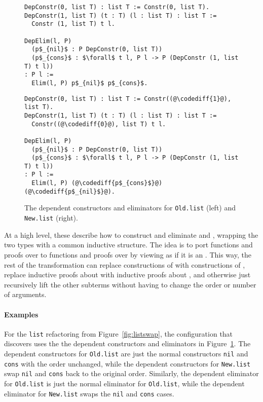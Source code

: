 \begin{figure}
\begin{minipage}{0.46\textwidth}
\begin{lstlisting}
DepConstr(0, list T) : list T := Constr(0, list T).
DepConstr(1, list T) (t : T) (l : list T) : list T :=
  Constr (1, list T) t l.

DepElim(l, P)
  (p$_{nil}$ : P DepConstr(0, list T))
  (p$_{cons}$ : $\forall$ t l, P l -> P (DepConstr (1, list T) t l))
: P l :=
  Elim(l, P) p$_{nil}$ p$_{cons}$.
\end{lstlisting}
\end{minipage}
\hfill
\begin{minipage}{0.46\textwidth}
\begin{lstlisting}
DepConstr(0, list T) : list T := Constr((@\codediff{1}@), list T).
DepConstr(1, list T) (t : T) (l : list T) : list T :=
  Constr((@\codediff{0}@), list T) t l.

DepElim(l, P)
  (p$_{nil}$ : P DepConstr(0, list T))
  (p$_{cons}$ : $\forall$ t l, P l -> P (DepConstr (1, list T) t l))
: P l :=
  Elim(l, P) (@\codediff{p$_{cons}$}@) (@\codediff{p$_{nil}$}@).
\end{lstlisting}
\end{minipage}
\caption{The dependent constructors and eliminators for \lstinline{Old.list} (left) and \lstinline{New.list} (right).}
\label{fig:listconfig}
\end{figure}

At a high level, these describe how to construct and eliminate \A and \B, wrapping the two types with a common inductive structure.
The idea is to port functions and proofs over \A to functions and proofs over \B by viewing \B as if it is an \A.
This way, the rest of the transformation can replace constructions of \A with constructions of \B,
replace inductive proofs about \A with inductive proofs about \B, and otherwise just recursively lift
the other subterms without having to change the order or number of arguments.

\paragraph{Examples}
For the \lstinline{list} refactoring from Figure~\ref{fig:listswap},
the configuration that \toolname discovers uses the the dependent constructors
and eliminators in Figure~\ref{fig:listconfig}. The dependent constructors for \lstinline{Old.list}
are just the normal constructors \lstinline{nil} and \lstinline{cons} with the order unchanged,
while the dependent constructors for \lstinline{New.list} swap \lstinline{nil} and \lstinline{cons}
back to the original order.
Similarly, the dependent eliminator for \lstinline{Old.list} is just the normal eliminator for \lstinline{Old.list},
while the dependent eliminator for \lstinline{New.list} swaps the \lstinline{nil} and \lstinline{cons} cases.

